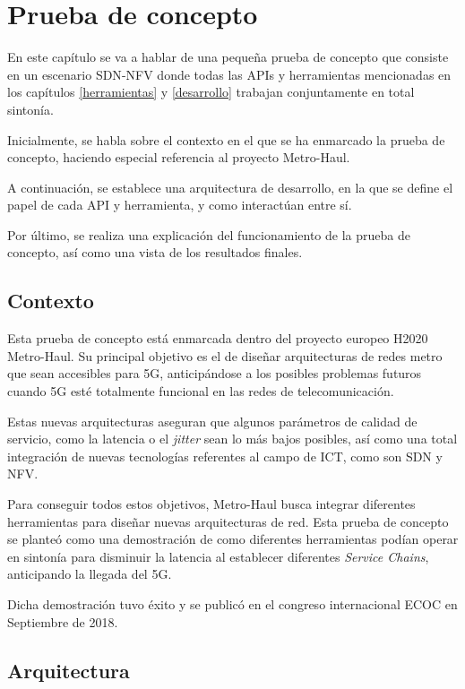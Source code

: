 \chapter{Prueba de concepto}
\label{pruebaconcepto}

En este capítulo se va a hablar de una pequeña prueba de concepto que consiste en un escenario \ac{SDN}-\ac{NFV} donde todas las \acp{API} y herramientas mencionadas en los capítulos \ref{herramientas} y \ref{desarrollo} trabajan conjuntamente en total sintonía.

Inicialmente, se habla sobre el contexto en el que se ha enmarcado la prueba de concepto, haciendo especial referencia al proyecto Metro-Haul.

A continuación, se establece una arquitectura de desarrollo, en la que se define el papel de cada \ac{API} y herramienta, y como interactúan entre sí.

Por último, se realiza una explicación del funcionamiento de la prueba de concepto, así como una vista de los resultados finales.

\section{Contexto}
\label{sec:contexto}

Esta prueba de concepto está enmarcada dentro del proyecto europeo H2020 Metro-Haul\cite{metrohaulbib}. Su principal objetivo es el de diseñar arquitecturas de redes metro que sean accesibles para 5G, anticipándose a los posibles problemas futuros cuando 5G esté totalmente funcional en las redes de telecomunicación.

Estas nuevas arquitecturas aseguran que algunos parámetros de calidad de servicio, como la latencia o el \textit{jitter} sean lo más bajos posibles, así como una total integración de nuevas tecnologías referentes al campo de \ac{ICT}, como son \ac{SDN} y \ac{NFV}.

Para conseguir todos estos objetivos, Metro-Haul busca integrar diferentes herramientas para diseñar nuevas arquitecturas de red. Esta prueba de concepto se planteó como una demostración de como diferentes herramientas podían operar en sintonía para disminuir la latencia al establecer diferentes \textit{Service Chains}, anticipando la llegada del 5G.\cite{demoecocbib}

Dicha demostración tuvo éxito y se publicó en el congreso internacional \ac{ECOC}\cite{ecocbib} en Septiembre de 2018.

\section{Arquitectura}
\label{sec:arquitectura}

